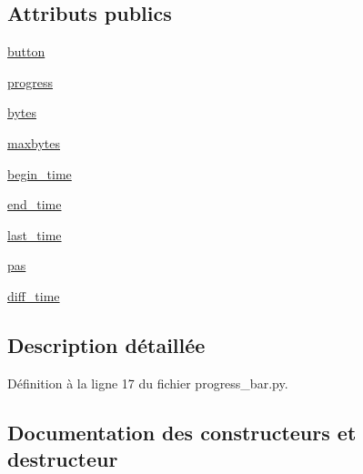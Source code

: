 \subsection*{Attributs publics}
\begin{DoxyCompactItemize}
\item 
\hyperlink{classScript_1_1progress__bar_1_1SampleApp_adcc315f09b0a9f25d6e88f3b437adc47}{button}
\item 
\hyperlink{classScript_1_1progress__bar_1_1SampleApp_a355ba6fd4aa8e8bf5e29af65f8f20438}{progress}
\item 
\hyperlink{classScript_1_1progress__bar_1_1SampleApp_ae94d76abefd4f51bfcdf5cd8c7e6733b}{bytes}
\item 
\hyperlink{classScript_1_1progress__bar_1_1SampleApp_a119658b6add8ce6f70ad9f6470549fd7}{maxbytes}
\item 
\hyperlink{classScript_1_1progress__bar_1_1SampleApp_a9514fa73fb289377cbade22206b07038}{begin\+\_\+time}
\item 
\hyperlink{classScript_1_1progress__bar_1_1SampleApp_aa1283405b946ed19504ad78ef1304ddf}{end\+\_\+time}
\item 
\hyperlink{classScript_1_1progress__bar_1_1SampleApp_a13f4e7f6791df1d752e0d0e9f89c8c35}{last\+\_\+time}
\item 
\hyperlink{classScript_1_1progress__bar_1_1SampleApp_a9904e1932de17caa7610352612c2e78c}{pas}
\item 
\hyperlink{classScript_1_1progress__bar_1_1SampleApp_a89091b21cdee15376ccac1c7a2b5c887}{diff\+\_\+time}
\end{DoxyCompactItemize}


\subsection{Description détaillée}


Définition à la ligne 17 du fichier progress\+\_\+bar.\+py.



\subsection{Documentation des constructeurs et destructeur}
\mbox{\label{classScript_1_1progress__bar_1_1SampleApp_ac74edf5e4c6a6835b34e3df414954187}} 
